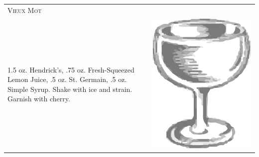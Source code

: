 \documentclass{article}
\begin{document}
\begin{tabular}{p{2in} p{0.5in}}
  \multicolumn{2}{p{3in}}{\centering\Huge\textsc{Vieux Mot}} \\ 
   \vspace{-0.1in}1.5 oz. Hendrick's, .75 oz. Fresh-Squeezed Lemon Juice, .5 oz. St. Germain, .5 oz. Simple Syrup. Shake with ice and strain. Garnish with cherry. &
   \vspace{-0.1in} \includegraphics{coupe.png}
\end{tabular}
\end{document}
